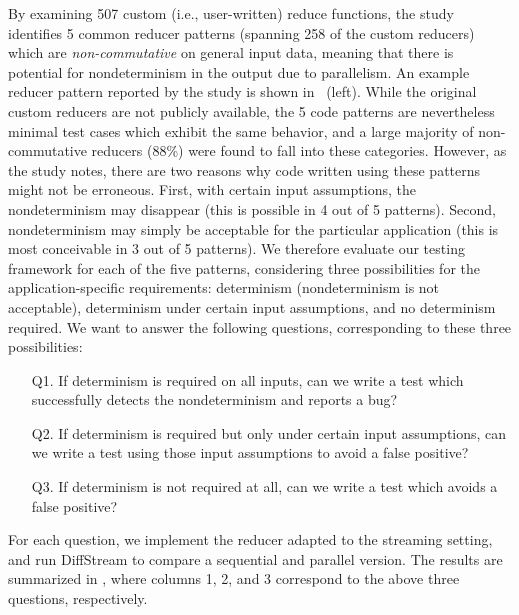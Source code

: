 By examining 507 custom (i.e., user-written) reduce functions, the study identifies 5 common reducer patterns (spanning 258 of the custom reducers) which are \emph{non-commutative} on general input data, meaning that there is potential for nondeterminism in the output due to parallelism.
An example reducer pattern reported by the study is shown in ~(left).
While the original custom reducers are not publicly available, the 5 code patterns are nevertheless minimal test cases which exhibit the same behavior, and a large majority of non-commutative reducers (88\%) were found to fall into these categories.
However, as the study notes, there are two reasons why code written using these patterns might not be erroneous. First, with certain input assumptions, the nondeterminism may disappear (this is possible in 4 out of 5 patterns). Second, nondeterminism may simply be acceptable for the particular application (this is most conceivable in 3 out of 5 patterns).
We therefore evaluate our testing framework for each of the five patterns, considering three possibilities for the application-specific requirements: determinism (nondeterminism is not acceptable), determinism under certain
input assumptions, and no determinism required. We want to answer the following questions, corresponding to these three possibilities:
\begin{enumerate}
\item[Q1.] If determinism is required on all inputs, can we write a test which successfully detects the nondeterminism and reports a bug?
\item[Q2.] If determinism is required but only under certain input assumptions, can we write a test using those input assumptions to avoid a false positive?
\item[Q3.] If determinism is not required at all, can we write a test which avoids a false positive?
\end{enumerate}
For each question, we implement the reducer adapted to the streaming setting, and run DiffStream to compare a sequential and parallel version.
The results are summarized in , where columns 1, 2, and 3 correspond to the above three questions, respectively.

